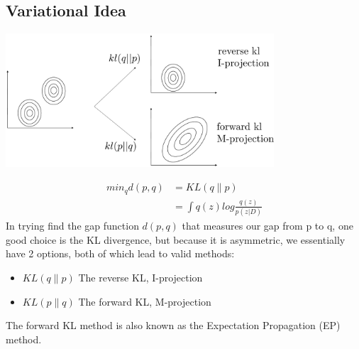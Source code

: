 \documentclass{article}
\begin{document}
\subsection{Variational Idea}
\centerline{\includegraphics[width=0.75\textwidth]{fig/v_ideas.pdf}}
\begin{align*}
min_q d(p,q) &= KL(q \| p) \\
&= \int q(z) log \frac{q(z)}{p(z|D)}
\end{align*}
In trying find the gap function $d(p,q)$ that measures our gap from p to q, one good choice is the KL divergence, but because it is asymmetric, we essentially have 2 options, both of which lead to valid methods:
\begin{itemize}
\item $KL(q \| p)$ 
\newline The reverse KL, I-projection 
\item $KL(p \| q)$
\newline The forward KL, M-projection
\end{itemize}
The forward KL method is also known as the Expectation Propagation (EP) method.
\end{document}
